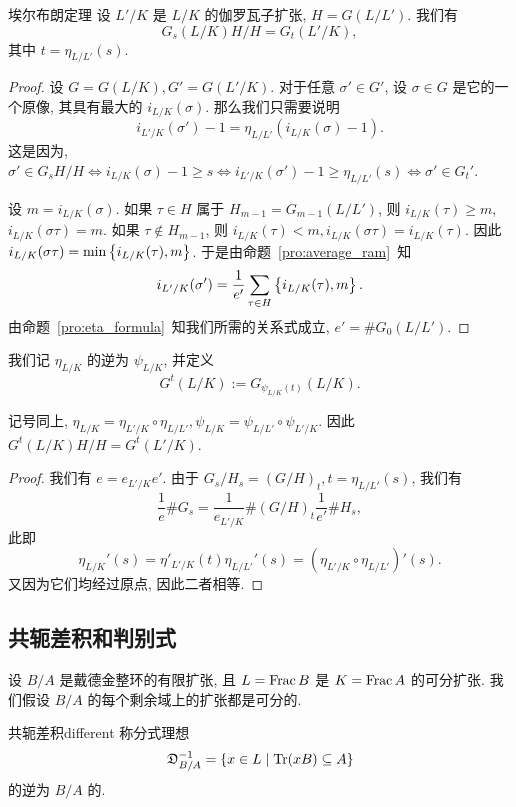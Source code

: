 \begin{theorem}{埃尔布朗定理}{}
设 $L'/K$ 是 $L/K$ 的伽罗瓦子扩张, $H=G(L/L')$. 我们有
  \[G_s(L/K)H/H=G_t(L'/K),\]
其中 $t=\eta_{L/L'}(s)$.
\end{theorem}
\begin{proof}
设 $G=G(L/K), G'=G(L'/K)$.  对于任意 $\sigma'\in G'$, 设 $\sigma \in G$ 是它的一个原像, 其具有最大的 $i_{L/K}(\sigma)$. 那么我们只需要说明
  \[i_{L'/K}(\sigma')-1=\eta_{L/L'}(i_{L/K}(\sigma)-1).\]
这是因为, $\sigma'\in G_s H/H\iff i_{L/K}(\sigma)-1\ge s\iff i_{L'/K}(\sigma')-1\ge \eta_{L/L'}(s)\iff \sigma'\in G_t'$. 

设 $m=i_{L/K}(\sigma)$. 如果 $\tau\in H$ 属于 $H_{m-1}=G_{m-1}(L/L')$, 则 $i_{L/K}(\tau)\ge m$, $i_{L/K}(\sigma\tau)=m$. 如果 $\tau\notin H_{m-1}$, 则 $i_{L/K}(\tau)<m, i_{L/K}(\sigma\tau)=i_{L/K}(\tau)$. 因此 $i_{L/K}(\sigma \tau)=\min\left\{i_{L/K}(\tau),m\right\}$.  于是由命题~\ref{pro:average_ram}~知
  \[i_{L'/K}(\sigma')=\frac{1}{e'}\sum_{\tau \in H}\left\{i_{L/K}(\tau),m\right\}.\]
由命题~\ref{pro:eta_formula}~知我们所需的关系式成立, $e'=\#G_0(L/L')$.
\end{proof}

我们记 $\eta_{L/K}$ 的逆为 $\psi_{L/K}$, 并定义
  \[G^t(L/K):=G_{\psi_{L/K}(t)}(L/K).\]
\begin{proposition}{}{}
记号同上, $\eta_{L/K}=\eta_{L'/K}\circ \eta_{L/L'},\psi_{L/K}=\psi_{L/L'}\circ \psi_{L'/K}$. 因此 $G^t(L/K)H/H=G^t(L'/K)$.
\end{proposition}
\begin{proof}
我们有 $e=e_{L'/K} e'$. 由于 $G_s/H_s=(G/H)_t, t=\eta_{L/L'}(s)$, 我们有
  \[\frac{1}{e}\# G_s=\frac{1}{e_{L'/K}}\#(G/H)_t\frac{1}{e'}\#H_s,\]
此即
  \[\eta_{L/K}'(s)=\eta'_{L'/K}(t)\eta_{L/L'}'(s)=(\eta_{L'/K}\circ\eta_{L/L'})'(s).\]
又因为它们均经过原点, 因此二者相等.
\end{proof}

\subsection{共轭差积和判别式}\label{ssec:different_and_discriminant}
设 $B/A$ 是戴德金整环的有限扩张, 且 $L={\mathrm{Frac}\,} B$ 是 $K={\mathrm{Frac}\,} A$ 的可分扩张. 我们假设 $B/A$ 的每个剩余域上的扩张都是可分的.

\begin{definition}{共轭差积}{different}
称分式理想
  \[{\mathfrak{D}}_{B/A}^{-1}=\left\{x\in L\mid {\mathrm{Tr}}(xB)\subseteq A\right\}\]
的逆为 $B/A$ 的.
\end{definition}

